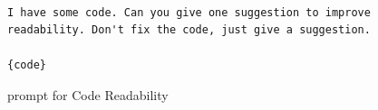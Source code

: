 \begin{figure}[h!]
\tiny
    \captionsetup{justification=centering, labelfont=bf, font=small}
    \begin{verbatim}

I have some code. Can you give one suggestion to improve readability. Don't fix the code, just give a suggestion.

{code}

\end{verbatim}

\caption{\fbmod prompt for Code Readability} %
\label{fig:prompt:readability:fb}
\end{figure}